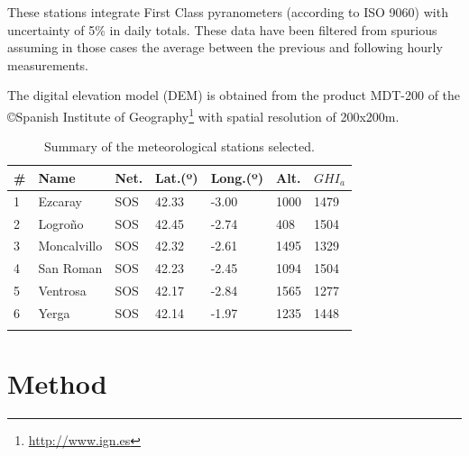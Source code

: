 \documentclass[article]{jss}
\begin{document}
These stations integrate First Class pyranometers (according to ISO
9060) with uncertainty of 5\% in daily totals. These data have been
filtered from spurious assuming in those cases the average between the
previous and following hourly measurements.

The digital elevation model (DEM) is obtained from the product
MDT-200 of the \copyright Spanish Institute of
Geography\footnote{\url{http://www.ign.es}} with spatial
resolution of 200x200m.


\begin{small}
\begin{longtable}{p{}p{}p{}p{}p{}p{}p{}}
  \toprule
  \# & Name & Net. & Lat.(º) & Long.(º) & Alt.  & $GHI_{a}$\\
  \midrule
  \endhead
 1 & Ezcaray & SOS & 42.33 & -3.00 & 1000 & 1479\\
  \midrule
 2 & Logroño & SOS & 42.45 & -2.74 & 408 & 1504\\
  \midrule 
3 & Moncalvillo & SOS & 42.32 & -2.61 & 1495 & 1329 \\
  \midrule
 4 & San Roman & SOS & 42.23 & -2.45 & 1094 & 1504 \\
  \midrule
  5 & Ventrosa & SOS & 42.17 & -2.84 & 1565 & 1277\\
  \midrule
  6 & Yerga & SOS& 42.14 & -1.97 & 1235 &1448\\
 \bottomrule
  \caption{Summary of the meteorological
    stations selected.}
  \label{tab:stations}
\end{longtable}
\end{small}

\section{Method}
\label{sec:method}
\end{document}
